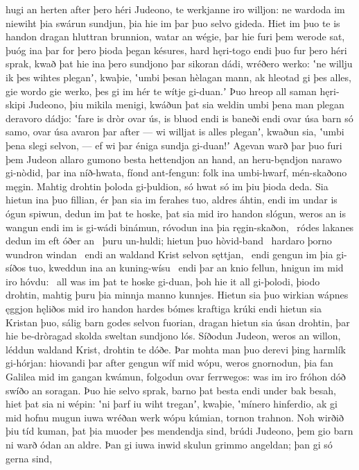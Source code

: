 hugi an herten after þero héri Judeono,
te werkjanne iro willjon: ne wardoda im niewiht
þia swárun sundjun, þia hie im þar þuo selvo gideda.
Hiet im þuo te is handon dragan hluttran brunnion,
watar an wégie, þar hie furi þem werode sat,
þuóg ina þar for þero þioda þegan késures,
hard hęri-togo endi þuo fur þero héri sprak,
kwað þat hie ina þero sundjono þar sikoran dádi,
wréðero werko: ʽne willju ik þes wihtes pleganʼ, kwaþie,
ʽumbi þesan hèlagan mann, ak hleotad gi þes alles,
gie wordo gie werko, þes gi im hér te wítje gi-duan.ʼ
Þuo hreop all saman hęri-skipi Judeono,
þiu mikila menigi, kwáðun þat sia weldin umbi þena man plegan
deravoro dádjo: ʽfare is dròr ovar ús,
is bluod endi is baneði endi ovar úsa barn só samo,
ovar úsa avaron þar after — wi willjat is alles pleganʼ, kwaðun sia,
ʽumbi þena slegi selvon, — ef wi þar éniga sundja gi-duan!ʼ
Agevan warð þar þuo furi þem Judeon allaro gumono besta
hettendjon an hand, an heru-bęndjon
narawo gi-nòdid, þar ina níð-hwata,
fíond ant-fengun: folk ina umbi-hwarf,
mén-skaðono męgin. Mahtig drohtin
þoloda gi-þuldion, só hwat só im þiu þioda deda.
Sia hietun ina þuo fillian, ér þan sia im ferahes tuo,
aldres áhtin, endi im undar is ógun spiwun,
dedun im þat te hoske, þat sia mid iro handon slógun,
weros an is wangun endi im is gi-wádi binámun,
róvodun ina þia ręgin-skaðon, \hld\ ródes lakanes
dedun im eft óðer an \hld\ þuru un-huldi;
hietun þuo hòvid-band \hld\ hardaro þorno
wundron windan \hld\ endi an waldand Krist
selvon sęttjan, \hld\ endi gengun im þia gi-síðos tuo,
kweddun ina an kuning-wísu \hld\ endi þar an knio fellun,
hnigun im mid iro hóvdu: \hld\ all was im þat te hoske gi-duan,
þoh hie it all gi-þolodi, þiodo drohtin,
mahtig þuru þia minnja manno kunnjes.
Hietun sia þuo wirkian wápnes ęggjon
hęliðos mid iro handon hardes bómes
kraftiga krúki endi hietun sia Kristan þuo,
sálig barn godes selvon fuorian,
dragan hietun sia úsan drohtin, þar hie be-dròragad skolda
sweltan sundjono lós. Síðodun Judeon,
weros an willon, léddun waldand Krist,
drohtin te dóðe. Þar mohta man þuo derevi þing
harmlík gi-hórjan: hiovandi þar after
gengun wíf mid wópu, weros gnornodun,
þia fan Galilea mid im gangan kwámun,
folgodun ovar ferrwegos: was im iro fróhon dóð
swíðo an soragan. Þuo hie selvo sprak,
barno þat besta endi under bak besah,
hiet þat sia ni wépin: ʽni þarf iu wiht treganʼ, kwaþie,
ʽmínero hinferdio, ak gi mid hofnu mugun
iuwa wréðan werk wópu kúmian,
tornon trahnon. Noh wirðið þiu tíd kuman,
þat þia muoder þes mendendja sind,
brúdi Judeono, þem gio barn ni warð
ódan an aldre. Þan gi iuwa inwid skulun
grimmo angeldan; þan gi só gerna sind,

